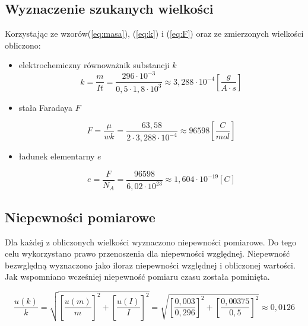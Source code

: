 \documentclass [a4paper,11pt]{article}
\begin{document}
	\subsection{Wyznaczenie szukanych wielkości}
		Korzystając ze wzorów(\ref{eq:masa}), (\ref{eq:k}) i (\ref{eq:F}) oraz ze zmierzonych wielkości obliczono:
	\begin{itemize}
		
		\item elektrochemiczny równoważnik substancji $k$
		\begin{equation}
		k = \frac{m}{I t} = \frac{296 \cdot 10^{-3}}{0,5 \cdot 1,8 \cdot 10^3} \approx 3,288\cdot 10^{-4} \left[  \frac{g}{A \cdot s}\right] 
		\label{k_obliczone} 
		\end{equation}
		
		\item stała Faradaya $F$
		
		\begin{equation}
		F = \frac{\mu}{w k} = \frac{63,58 }{2 \cdot 3,288 \cdot 10^{-4}} \approx 96598  \left[  \frac{C}{mol}\right] 
		\label{F_obliczone} 
		\end{equation}
		
		\item ładunek elementarny $e$
		
		\begin{equation}
		e = \frac{F}{N_A} = \frac{96598 }{6,02 \cdot 10^{23}} \approx 1,604 \cdot 10^{-19}   \left[  C \right] 
		\label{e_obliczone} 
		\end{equation}
	\end{itemize}
 
 	
 	\subsection{Niepewności pomiarowe }
 	

 	Dla każdej z obliczonych wielkości wyznaczono niepewności pomiarowe. Do tego celu wykorzystano prawo przenoszenia dla niepewności względnej. Niepewność bezwględną wyznaczono jako iloraz niepewności względnej i obliczonej wartości.
 	Jak wspomniano wcześniej niepewność pomiaru czasu została pominięta.

 	\begin{equation}
 	\frac{u(k)}{k} = \sqrt{\left[\frac{u(m)}{m} \right]^2 + \left[\frac{u(I)}{I} \right]^2 } = \sqrt{\left[\frac{ 0,003}{0,296} \right]^2 + \left[\frac{0,00375}{0,5} \right]^2 } \approx 0,0126
 	\end{equation}
 	
\end{document}
